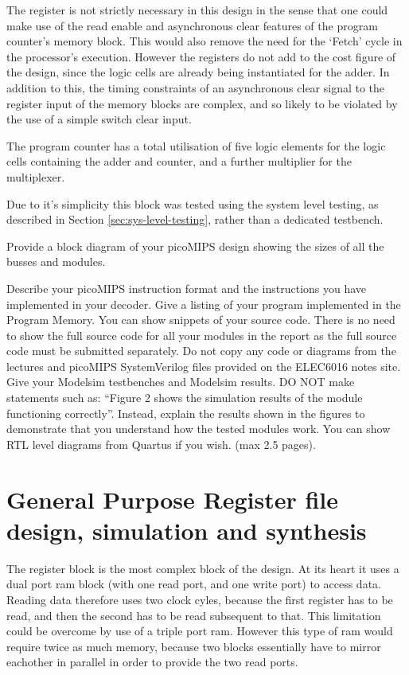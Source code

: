 The register is not strictly necessary in this design in the sense that one could make use of the read enable and asynchronous clear features of the program counter's memory block. This would also remove the need for the `Fetch' cycle in the processor's execution. However the registers do not add to the cost figure of the design, since the logic cells are already being instantiated for the adder. In addition to this, the timing constraints of an asynchronous clear signal to the register input of the memory blocks are complex, and so likely to be violated by the use of a simple switch clear input.

The program counter has a total utilisation of five logic elements for the logic cells containing the adder and counter, and a further multiplier for the multiplexer.

Due to it's simplicity this block was tested using the system level testing, as described in Section \ref{sec:sys-level-testing}, rather than a dedicated testbench.


\review
{
	Provide a block diagram of your picoMIPS design showing the sizes of all the busses and modules.
	
	Describe your picoMIPS instruction format and the instructions you have implemented in your decoder.
	Give a listing of your program implemented in the Program Memory. You can show snippets of your source code.
	There is no need to show the full source code for all your modules in the report as the full source code must be submitted separately.
	Do not copy any code or diagrams from the lectures and picoMIPS SystemVerilog files provided on the ELEC6016 notes site.
	Give your Modelsim testbenches and Modelsim results.
	DO NOT make statements such as: “Figure 2 shows the simulation results of the module functioning correctly”.
	Instead, explain the results shown in the figures to demonstrate that you understand how the tested modules work.
	You can show RTL level diagrams from Quartus if you wish. (max 2.5 pages).
}


\section{General Purpose Register file design, simulation and synthesis}

The register block is the most complex block of the design. At its heart it uses a dual port \gls{ram} block (with one read port, and one write port) to access data. Reading data therefore uses two clock cyles, because the first register has to be read, and then the second has to be read subsequent to that. This limitation could be overcome by use of a triple port \gls{ram}. However this type of \gls{ram} would require twice as much memory, because two blocks essentially have to mirror eachother in parallel in order to provide the two read ports.

